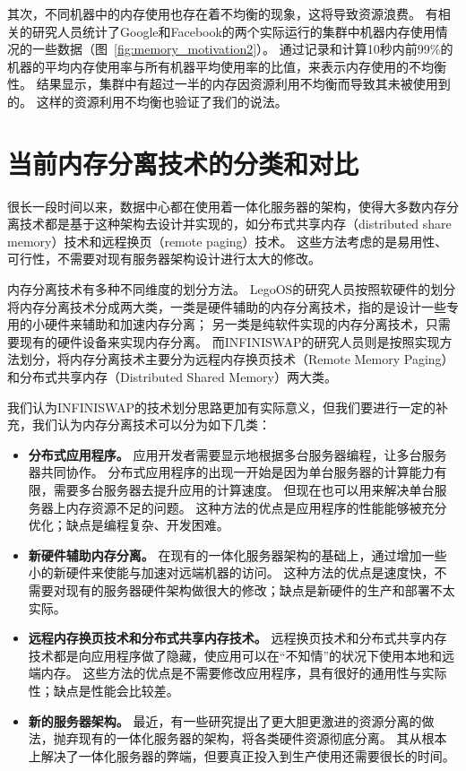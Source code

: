 其次，不同机器中的内存使用也存在着不均衡的现象，这将导致资源浪费。
有相关的研究人员统计了Google和Facebook的两个实际运行的集群中机器内存使用情况的一些数据（图~\ref{fig:memory_motivation2}）。
通过记录和计算10秒内前99\%的机器的平均内存使用率与所有机器平均使用率的比值，来表示内存使用的不均衡性。
结果显示，集群中有超过一半的内存因资源利用不均衡而导致其未被使用到的。
这样的资源利用不均衡也验证了我们的说法。



\section{当前内存分离技术的分类和对比}

很长一段时间以来，数据中心都在使用着一体化服务器的架构，使得大多数内存分离技术都是基于这种架构去设计并实现的，如分布式共享内存（distributed share memory）技术和远程换页（remote paging）技术。
这些方法考虑的是易用性、可行性，不需要对现有服务器架构设计进行太大的修改。

内存分离技术有多种不同维度的划分方法。
LegoOS\cite{shan2018legoos}的研究人员按照软硬件的划分将内存分离技术分成两大类，一类是硬件辅助的内存分离技术，指的是设计一些专用的小硬件来辅助和加速内存分离；
另一类是纯软件实现的内存分离技术，只需要现有的硬件设备来实现内存分离。
而INFINISWAP的研究人员则是按照实现方法划分，将内存分离技术主要分为远程内存换页技术（Remote Memory Paging）和分布式共享内存（Distributed Shared Memory）两大类。

我们认为INFINISWAP的技术划分思路更加有实际意义，但我们要进行一定的补充，我们认为内存分离技术可以分为如下几类：

\begin{itemize}
\item \textbf{分布式应用程序。}
应用开发者需要显示地根据多台服务器编程，让多台服务器共同协作。
分布式应用程序的出现一开始是因为单台服务器的计算能力有限，需要多台服务器去提升应用的计算速度。
但现在也可以用来解决单台服务器上内存资源不足的问题。
这种方法的优点是应用程序的性能能够被充分优化；缺点是编程复杂、开发困难。

\item \textbf{新硬件辅助内存分离。}
在现有的一体化服务器架构的基础上，通过增加一些小的新硬件来使能与加速对远端机器的访问。
这种方法的优点是速度快，不需要对现有的服务器硬件架构做很大的修改；缺点是新硬件的生产和部署不太实际。

\item \textbf{远程内存换页技术和分布式共享内存技术。}
远程换页技术和分布式共享内存技术都是向应用程序做了隐藏，使应用可以在“不知情”的状况下使用本地和远端内存。
这些方法的优点是不需要修改应用程序，具有很好的通用性与实际性；缺点是性能会比较差。

\item \textbf{新的服务器架构。}
最近，有一些研究提出了更大胆更激进的资源分离的做法，抛弃现有的一体化服务器的架构，将各类硬件资源彻底分离。
其从根本上解决了一体化服务器的弊端，但要真正投入到生产使用还需要很长的时间。

\end{itemize}


